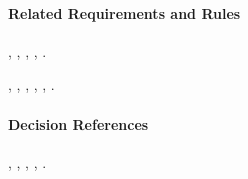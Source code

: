 \paragraph{Related Requirements and Rules}
\hyperref[fr:049]{}, \hyperref[fr:050]{}, \hyperref[fr:053]{}, \hyperref[fr:054]{}, \hyperref[fr:061]{}.

\hyperref[br:012]{}, \hyperref[br:032]{}, \hyperref[br:034]{}, \hyperref[br:036]{}, \hyperref[br:038]{}, \hyperref[br:044]{}.

\paragraph{Decision References}
, , , , .
